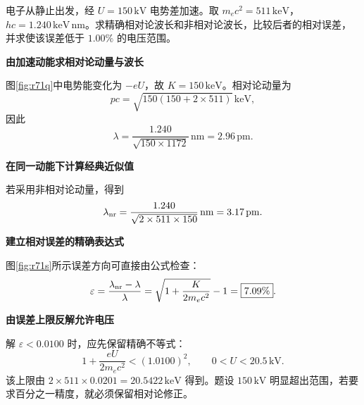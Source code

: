 \begin{question}
\begin{example}[高电压电子的波长与近似误差]\label{ex:r71}
电子从静止出发，经 \(U=150\,\mathrm{kV}\) 电势差加速。取 \(m_ec^2=511\,\mathrm{keV}\)，\(hc=1.240\,\mathrm{keV\,nm}\)。求精确相对论波长和非相对论波长，比较后者的相对误差，并求使该误差低于 \(1.00\%\) 的电压范围。
\end{example}
\end{question}

\begin{solution}\textbf{由加速动能求相对论动量与波长}\par\nobreak
图\ref{fig:r71q}中电势能变化为 \(-eU\)，故 \(K=150\,\mathrm{keV}\)。相对论动量为
\[
 pc=\sqrt{150(150+2\times511)}\,\mathrm{keV},
\]
因此
\[
 \boxed{\lambda=\frac{1.240}{\sqrt{150\times1172}}\,\mathrm{nm}
 =2.96\,\mathrm{pm}}.
\]


\par\medskip{}\noindent\textbf{在同一动能下计算经典近似值}\par\nobreak
若采用非相对论动量，得到
\[
 \lambda_{\rm nr}=\frac{1.240}{\sqrt{2\times511\times150}}\,\mathrm{nm}
 =3.17\,\mathrm{pm}.
\]



\par\medskip{}\noindent\textbf{建立相对误差的精确表达式}\par\nobreak
图\ref{fig:r71s}所示误差方向可直接由公式检查：
\[
 \varepsilon=\frac{\lambda_{\rm nr}-\lambda}{\lambda}
 =\sqrt{1+\frac K{2m_ec^2}}-1
 =\boxed{7.09\%}.
\]


\par\medskip{}\noindent\textbf{由误差上限反解允许电压}\par\nobreak
解 \(\varepsilon<0.0100\) 时，应先保留精确不等式：
\[
 1+\frac{eU}{2m_ec^2}<(1.0100)^2,\qquad
 \boxed{0<U<20.5\,\mathrm{kV}}.
\]
该上限由 \(2\times511\times0.0201=20.5422\,\mathrm{keV}\) 得到。题设 \(150\,\mathrm{kV}\) 明显超出范围，若要求百分之一精度，就必须保留相对论修正。
\end{solution}

